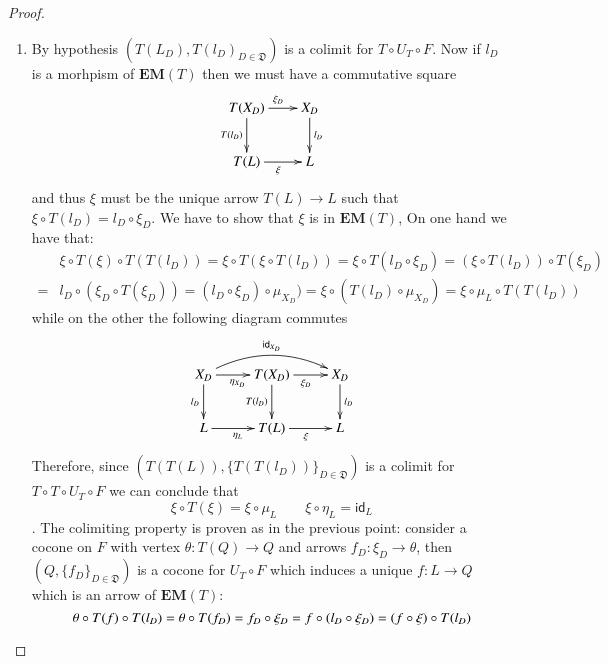 \documentclass[12pt]{article}
\theoremstyle{definition}
\def\D{\mathfrak D}
\newcommand{\eim}[1]{\mathbf{EM}{(#1)}}
\numberwithin{equation}{section}
\newcommand{\id}[1]{\mathsf{id}_{#1}}
\begin{document}
\begin{proof}
\begin{enumerate}[\rm(1)]
		\item By hypothesis $(T(L_D), T(l_D)_{D\in \D})$ is a colimit for $T\circ U_T\circ F$. Now if $l_D$ is a morhpism of $\eim{T}$ then we must have a commutative square
		\[
		\xymatrix@C=20pt{
			T(X_D)\ar[r]^{\xi_D} \ar[d]_{T(l_D)} & X_D\ar[d]^{l_D}\\
			T(L)\ar[r]_{\xi} & L	
		}
		\]
		and thus $\xi$ must be the unique arrow $T(L)\rightarrow L$ such that $ \xi \circ T(l_D)=l_D\circ \xi_D$.   We have to show that $\xi$ is in $\eim{T}$,
		On one hand we have that:
		\begin{align*}
		& \xi \circ T(\xi)\circ  T(T(l_D))= \xi \circ T(\xi\circ T(l_D))=\xi \circ T(l_D\circ \xi_D)=(\xi \circ T(l_D))\circ T(\xi_D)\\=&l_D\circ (\xi_D\circ T(\xi_D))=(l_D\circ \xi_D)\circ \mu_{X_D}) =\xi\circ (T(l_D)\circ \mu_{X_D})=\xi\circ \mu_L\circ T(T(l_D))
		\end{align*}
		while on the other the following diagram commutes
		\[
		\xymatrix{
			X_D\ar[d]_{l_D}\ar@/^0.5cm/[rr]^{\id{X_D}}\ar[r]_{\eta_{X_D}} & T(X_D)\ar[r]_{\xi_D} \ar[d]_{T(l_D)} & X_D \ar[d]^{l_D}\\
		L\ar[r]_{\eta_L}&T(L)\ar[r]_{\xi} &L	
	}
		\]
		Therefore, 	since  $(T(T(L)), \{T(T(l_D))\}_{D\in \D})$ is a colimit for $T\circ T\circ U_T\circ F$ we can conclude that
		\[\xi \circ T(\xi)=\xi\circ \mu_L\qquad \xi\circ \eta_L=\id{L}\]. The colimiting property is proven as in the previous point: consider a cocone on $F$ with vertex $\theta:T(Q)\rightarrow Q$ and arrows $f_D:\xi_D \rightarrow \theta$, then $(Q, \{f_D\}_{D\in \D})$ is a cocone for $U_T\circ F$ which induces a unique $f:L\rightarrow Q$ which is an arrow of $\eim{T}$:
		\[\theta\circ T(f)\circ T(l_D) =\theta\circ T(f_D)=f_D\circ \xi_D=f\circ (l_D\circ \xi_D)=(f\circ \xi) \circ T(l_D)   \qedhere\] 
	\end{enumerate}	
\end{proof}
\end{document}
